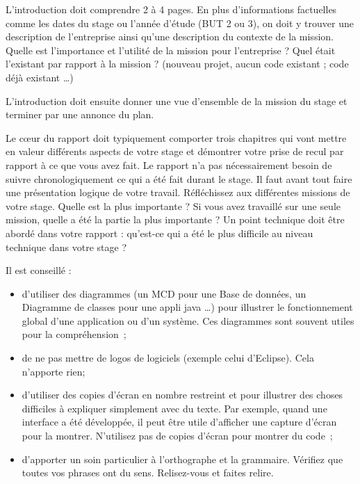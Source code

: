 \documentclass[12pt,oneside,noprintercorrection]{iut}
\begin{document}
\begin{aide}{}{}
  L'introduction doit comprendre 2 à 4 pages. En plus d'informations factuelles comme les dates du stage ou l'année d'étude (BUT 2 ou 3), on doit y trouver une description de l'entreprise ainsi qu'une description du contexte de la mission. Quelle est l'importance et l'utilité de la mission pour l'entreprise ? Quel était l'existant par rapport à la mission ? (nouveau projet, aucun code existant ; code déjà existant \dots)

  L'introduction doit ensuite donner une vue d'ensemble de la mission du stage et terminer par une annonce du plan.

\end{aide}

\begin{aide}{}{}
  Le c\oe ur du rapport doit typiquement comporter trois chapitres qui vont mettre en valeur différents aspects de votre stage et démontrer votre prise de recul par rapport à ce que vous avez fait. Le rapport n'a pas nécessairement besoin de suivre chronologiquement ce qui a été fait durant le stage. Il faut avant tout faire une présentation logique de votre travail. Réfléchissez aux différentes missions de votre stage. Quelle est la plus importante ? Si vous avez travaillé sur une seule mission, quelle a été la partie la plus importante ? Un point technique doit être abordé dans votre rapport : qu'est-ce qui a été le plus difficile au niveau technique dans votre stage ?

  Il est conseillé :
  \begin{itemize}
    \item  d'utiliser des diagrammes (un MCD pour une Base de données, un Diagramme de classes pour une appli java \dots) pour illustrer le fonctionnement global d'une application ou d'un système. Ces diagrammes sont souvent utiles pour la compréhension~;
    \item de ne pas mettre de logos de logiciels (exemple celui d'Eclipse). Cela n'apporte rien;
    \item d'utiliser des copies d'écran en nombre restreint et pour illustrer des choses difficiles à expliquer simplement avec du texte. Par exemple, quand une interface a été développée, il peut être utile d'afficher une capture d'écran pour la montrer. N'utilisez pas de copies d'écran pour montrer du code~;
    \item d'apporter un soin particulier à l'orthographe et la grammaire. Vérifiez que toutes vos phrases ont du sens. Relisez-vous et faites relire.
  \end{itemize}

\end{aide}
\end{document}
